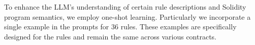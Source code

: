 
To enhance the LLM's understanding of certain 
rule descriptions and Solidity program semantics, 
we employ one-shot learning. Particularly we incorporate a single example 
in the prompts for 36 rules. These examples are specifically designed for the rules 
and remain the same across various contracts.

